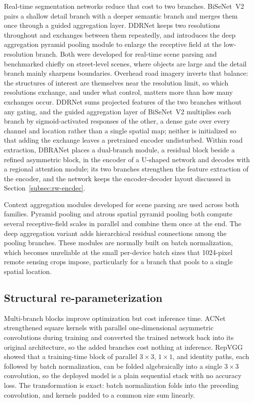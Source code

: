 \documentclass[a4paper,fleqn, review]{cas-sc}
\begin{document}
Real-time segmentation networks reduce that cost to two branches. BiSeNet~V2
\cite{yu2021bisenetv2} pairs a shallow detail branch with a deeper semantic
branch and merges them once through a guided aggregation layer. DDRNet
\cite{pan2023ddrnet} keeps two resolutions throughout and exchanges between them
repeatedly, and introduces the deep aggregation pyramid pooling module to enlarge
the receptive field at the low-resolution branch. Both were developed for
real-time scene parsing and benchmarked chiefly on street-level scenes, where
objects are large and the detail branch mainly sharpens boundaries. Overhead
road imagery inverts that balance: the structures of interest are themselves
near the resolution limit, so which resolutions exchange, and under what
control, matters more than how many exchanges occur. DDRNet sums projected
features of the two branches without any gating, and the guided aggregation
layer of BiSeNet~V2 multiplies each branch by sigmoid-activated responses of
the other, a dense gate over every channel and location rather than a single
spatial map; neither is initialized so that adding the exchange leaves a
pretrained encoder undisturbed. Within road extraction, DBRANet
\cite{chen2022dbranet} places a dual-branch module, a residual block beside a
refined asymmetric block, in the encoder of a U-shaped network and decodes
with a regional attention module; its two branches strengthen the feature
extraction of the encoder, and the network keeps the encoder-decoder layout
discussed in Section~\ref{subsec:rw-encdec}.

Context aggregation modules developed for scene parsing are used across both
families. Pyramid pooling \cite{zhao2017pspnet} and atrous spatial pyramid
pooling \cite{chen2018deeplab} both compute several receptive-field scales
in parallel and combine them once at the end. The deep aggregation variant
\cite{pan2023ddrnet} adds hierarchical residual connections among the pooling
branches. These modules are normally built on batch normalization, which becomes
unreliable at the small per-device batch sizes \cite{wu2020groupnorm} that
1024-pixel remote sensing crops impose, particularly for a branch that pools
to a single spatial location.



\subsection{Structural re-parameterization}
\label{subsec:rw-reparam}

Multi-branch blocks improve optimization but cost inference time. ACNet
\cite{ding2019acnet} strengthened square kernels with parallel
one-dimensional asymmetric convolutions during training and converted the
trained network back into its original architecture, so the added branches
cost nothing at inference. RepVGG
\cite{ding2021repvgg} showed that a training-time block of parallel $3\times3$,
$1\times1$, and identity paths, each followed by batch normalization, can be
folded algebraically into a single $3\times3$ convolution, so the deployed model
is a plain sequential stack with no accuracy loss. The transformation is exact:
batch normalization folds into the preceding convolution, and kernels padded to a
common size sum linearly.
\end{document}
